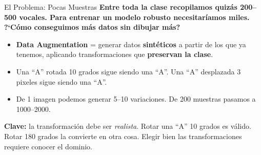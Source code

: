 \documentclass[aspectratio=169, 11pt]{beamer}
\begin{document}
\begin{frame}{El Problema: Pocas Muestras}
  \vspace{-4pt}
  {\footnotesize\color{arcaDark}\bfseries
    Entre toda la clase recopilamos quiz\'as 200--500 vocales.
    Para entrenar un modelo robusto necesitar\'iamos miles.
    ?`C\'omo conseguimos m\'as datos sin dibujar m\'as?}

  \vspace{8pt}
  {\footnotesize
  \begin{itemize}\setlength{\itemsep}{5pt}
    \item[{\color{arcaRed}\scriptsize\faArrowRight}]
      \textbf{Data Augmentation} = generar datos \textbf{sint\'eticos}
      a partir de los que ya tenemos, aplicando transformaciones que
      \textbf{preservan la clase}.
    \item[{\color{arcaRed}\scriptsize\faArrowRight}]
      Una ``A'' rotada 10 grados sigue siendo una ``A''.
      Una ``A'' desplazada 3 pixeles sigue siendo una ``A''.
    \item[{\color{codeGreen}\scriptsize\faArrowRight}]
      De 1 imagen podemos generar 5--10 variaciones.
      De 200 muestras pasamos a 1000--2000.
  \end{itemize}
  }

  \vspace{6pt}
  \begin{tcolorbox}[colback=arcaGray, colframe=arcaRed, boxrule=0.5pt, arc=2pt,
    left=6pt, right=6pt, top=4pt, bottom=4pt]
    {\scriptsize\color{arcaDark}
    \faKey\hspace{4pt}\textbf{Clave:} la transformaci\'on debe ser
    \textit{realista}. Rotar una ``A'' 10 grados es v\'alido.
    Rotar 180 grados la convierte en otra cosa. Elegir bien las
    transformaciones requiere conocer el dominio.}
  \end{tcolorbox}
\end{frame}
\end{document}
